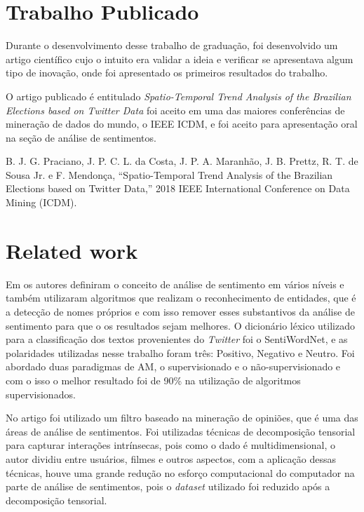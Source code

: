 \section{Trabalho Publicado}

Durante o desenvolvimento desse trabalho de graduação, foi desenvolvido um artigo científico cujo o intuito era validar a ideia e verificar se apresentava
algum tipo de inovação, onde foi apresentado os primeiros resultados do trabalho. 

O artigo publicado é entitulado \textit{Spatio-Temporal Trend Analysis of the Brazilian Elections based on Twitter Data} foi aceito em uma das maiores
conferências de mineração de dados do mundo, o \acrshort{IEEE} \acrshort{ICDM}, e foi aceito para apresentação oral na seção de análise de sentimentos.

B. J. G. Praciano, J. P. C. L. da Costa, J. P. A. Maranhão, J. B. Prettz, R. T. de Sousa Jr. e F. Mendonça, “Spatio-Temporal Trend Analysis of the Brazilian Elections based on Twitter Data,”  2018 IEEE International Conference on Data Mining (ICDM).


\section{Related work}

Em \cite{8474783} os autores definiram o conceito de análise de sentimento em vários níveis e também utilizaram algoritmos que realizam o reconhecimento de entidades, que é
a detecção de nomes próprios e com isso remover esses substantivos da análise de sentimento para que o os resultados sejam melhores. O dicionário léxico utilizado para a classificação
dos textos provenientes do \textit{Twitter} foi o SentiWordNet, e as polaridades utilizadas nesse trabalho foram três: Positivo, Negativo e Neutro. Foi abordado duas paradigmas
de \acrshort{AM}, o supervisionado e o não-supervisionado e com o isso o melhor resultado foi de 90\% na utilização de algoritmos supervisionados.


No artigo \cite{6413737} foi utilizado um filtro baseado na mineração de opiniões, que é uma das áreas de análise de sentimentos. Foi utilizadas técnicas de decomposição 
tensorial para capturar interações intrínsecas, pois como o dado é multidimensional, o autor dividiu entre usuários, filmes e outros aspectos, com a aplicação dessas técnicas,
houve uma grande redução no esforço computacional do computador na parte de análise de sentimentos, pois o \textit{dataset} utilizado foi reduzido após a decomposição tensorial.


